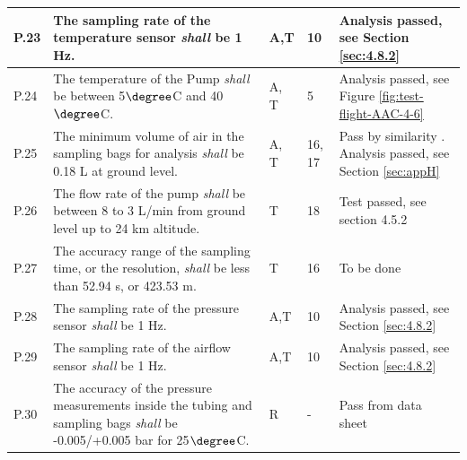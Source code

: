 \documentclass[a4paper,12pt,twoside]{article}
\begin{document}
\begin{longtable}[]{|m{}| m{} |m{} |m{}|m{}|}
P.23 & The sampling rate of the temperature sensor \textit{shall} be 1 Hz.                                                                                    &         A,T     & 10            &  Analysis passed, see Section \ref{sec:4.8.2}      \\ \hline
P.24 & The temperature of the Pump \textit{shall} be between 5$\degree$C and 40$\degree$C.                                                                                                    &       A, T       & 5           & Analysis passed, see Figure \ref{fig:test-flight-AAC-4-6}        \\ \hline
P.25 & The minimum volume of air in the sampling bags for analysis \textit{shall} be 0.18 L at ground level.                                                                                                    &       A, T       & 16, 17            &  Pass by similarity \cite{LISA}. Analysis passed, see Section \ref{sec:appH}                        \\ \hline

P.26 & The flow rate of the pump \textit{shall} be between 8 to 3 L/min from ground level up to 24 km altitude. & T & 18 & Test passed, see section 4.5.2 \\ \hline

P.27 &  The accuracy range of the sampling time, or the resolution, \textit{shall} be less than 52.94 s, or 423.53 m. & T & 16 & To be done \\ \hline
P.28 & The sampling rate of the pressure sensor \textit{shall} be 1 Hz.                                                                                    &         A,T     & 10            &  Analysis passed, see Section \ref{sec:4.8.2}      \\ \hline
P.29 & The sampling rate of the airflow sensor \textit{shall} be 1 Hz.                                                                                    &         A,T     & 10            &  Analysis passed, see Section \ref{sec:4.8.2}      \\ \hline
P.30 & The accuracy of the pressure measurements inside the tubing and sampling bags \textit{shall} be -0.005/+0.005 bar for 25$\degree$C.                                                                              &        R      &  -          & Pass from data sheet       \\ \hline


\end{longtable}
\end{document}
